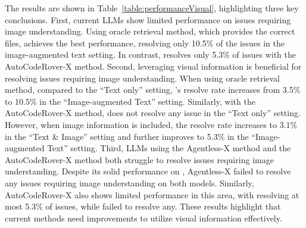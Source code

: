  The results are shown in Table~\ref{table:performanceVisual}, highlighting three key conclusions. First, current LLMs show limited performance on issues requiring image understanding. Using oracle retrieval method, which provides the correct files, \Claude achieves the best performance, resolving only 10.5\% of the issues in the image-augmented text setting. 
In contrast, \GPT resolves only 5.3\% of issues with the AutoCodeRover-X method. Second, leveraging visual information is beneficial for resolving issues requiring image understanding. When using oracle retrieval method, compared to the ``Text only'' setting, \Claude's resolve rate increases from 3.5\% to 10.5\% in the ``Image-augmented Text'' setting. Similarly, with the AutoCodeRover-X method, \GPT does not resolve any issue in the ``Text only'' setting. However, when image information is included, the resolve rate increases to 3.1\% in the ``Text \& Image'' setting and further improves to 5.3\% in the ``Image-augmented Text'' setting. Third, LLMs using the Agentless-X method and the AutoCodeRover-X method both struggle to resolve issues requiring image understanding.  Despite its solid performance on \Swebenchx, Agentless-X failed to resolve any issues requiring image understanding on both models. Similarly, AutoCodeRover-X also shows limited performance in this area, with \GPT resolving at most 5.3\% of issues, while \Claude failed to resolve any. These results highlight that current methods need improvements to utilize visual information effectively.

 



